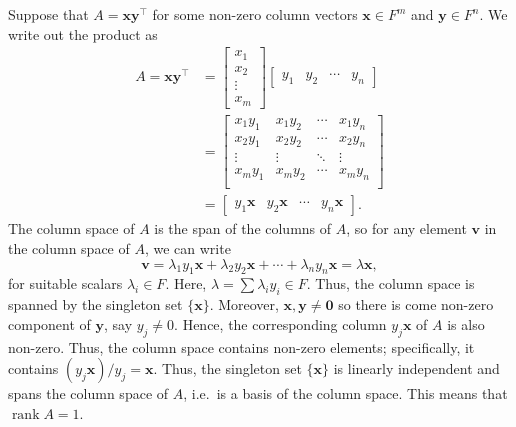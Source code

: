 \documentclass[10pt]{article}
\def\x{\bm{x}}
\def\y{\bm{y}}
\def\v{\bm{v}}
\def\xcol{\begin{bmatrix} x_1 \\ x_2 \\ \vdots \\ x_m \end{bmatrix} }
\def\yrow{\begin{bmatrix} y_1 & y_2 & \cdots & y_n \end{bmatrix} }
\def\rank{\operatorname{rank}}
\begin{document}
        Suppose that $A = \x\y^\top$ for some non-zero column vectors $\x \in F^m$ and $\y \in F^n$. We write out the product as
        \begin{align*}
                A = \x\y^\top &= \xcol\yrow \\
                        &= \begin{bmatrix}
                                x_1y_1 & x_1y_2 & \cdots & x_1y_n \\
                                x_2y_1 & x_2y_2 & \cdots & x_2y_n \\
                                \vdots & \vdots & \ddots & \vdots \\
                                x_my_1 & x_my_2 & \cdots & x_my_n \\
                        \end{bmatrix} \\
                        &= \begin{bmatrix}
                                y_1\x & y_2\x & \cdots & y_n\x
                        \end{bmatrix}.
        \end{align*}        
        The column space of $A$ is the span of the columns of $A$, so for any element $\v$ in the column space of $A$, we can write
        \[
                \v = \lambda_1y_1\x + \lambda_2y_2\x + \cdots + \lambda_ny_n\x = \lambda \x,
        \]
        for suitable scalars $\lambda_i \in F$. Here, $\lambda = \sum \lambda_iy_i \in F$.
        Thus, the column space is spanned by the singleton set $\{\x\}$. Moreover, $\x,\y \neq \mathbf{0}$ so there is come non-zero component
        of $\y$, say $y_j \neq 0$. Hence, the corresponding column $y_j\x$ of $A$ is also non-zero. Thus, the column space contains
        non-zero elements; specifically, it contains $(y_j\x) / y_j = \x$. Thus, the singleton set $\{\x\}$ is linearly independent and
        spans the column space of $A$, i.e.\ is a basis of the column space. This means that $\rank{A} = 1$. \\
\end{document}
